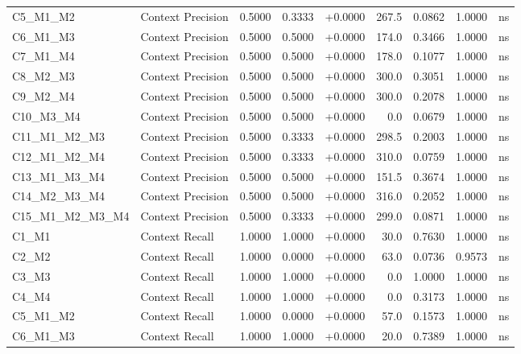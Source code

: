 \begin{table}[p]
\begin{tabular*}{\textwidth}{@{\extracolsep{\fill}} l l r r r r r r c @{}}
\addlinespace
C5\_M1\_M2      & Context Precision    & 0.5000 & 0.3333 & +0.0000 & 267.5 & 0.0862 & 1.0000 & ns \\
\addlinespace
C6\_M1\_M3      & Context Precision    & 0.5000 & 0.5000 & +0.0000 & 174.0 & 0.3466 & 1.0000 & ns \\
\addlinespace
C7\_M1\_M4      & Context Precision    & 0.5000 & 0.5000 & +0.0000 & 178.0 & 0.1077 & 1.0000 & ns \\
\addlinespace
C8\_M2\_M3      & Context Precision    & 0.5000 & 0.5000 & +0.0000 & 300.0 & 0.3051 & 1.0000 & ns \\
\addlinespace
C9\_M2\_M4      & Context Precision    & 0.5000 & 0.5000 & +0.0000 & 300.0 & 0.2078 & 1.0000 & ns \\
\addlinespace
C10\_M3\_M4     & Context Precision    & 0.5000 & 0.5000 & +0.0000 & 0.0 & 0.0679 & 1.0000 & ns \\
\addlinespace
C11\_M1\_M2\_M3 & Context Precision    & 0.5000 & 0.3333 & +0.0000 & 298.5 & 0.2003 & 1.0000 & ns \\
\addlinespace
C12\_M1\_M2\_M4 & Context Precision    & 0.5000 & 0.3333 & +0.0000 & 310.0 & 0.0759 & 1.0000 & ns \\
\addlinespace
C13\_M1\_M3\_M4 & Context Precision    & 0.5000 & 0.5000 & +0.0000 & 151.5 & 0.3674 & 1.0000 & ns \\
\addlinespace
C14\_M2\_M3\_M4 & Context Precision    & 0.5000 & 0.5000 & +0.0000 & 316.0 & 0.2052 & 1.0000 & ns \\
\addlinespace
C15\_M1\_M2\_M3\_M4 & Context Precision    & 0.5000 & 0.3333 & +0.0000 & 299.0 & 0.0871 & 1.0000 & ns \\
\addlinespace
C1\_M1          & Context Recall       & 1.0000 & 1.0000 & +0.0000 & 30.0 & 0.7630 & 1.0000 & ns \\
\addlinespace
C2\_M2          & Context Recall       & 1.0000 & 0.0000 & +0.0000 & 63.0 & 0.0736 & 0.9573 & ns \\
\addlinespace
C3\_M3          & Context Recall       & 1.0000 & 1.0000 & +0.0000 & 0.0 & 1.0000 & 1.0000 & ns \\
\addlinespace
C4\_M4          & Context Recall       & 1.0000 & 1.0000 & +0.0000 & 0.0 & 0.3173 & 1.0000 & ns \\
\addlinespace
C5\_M1\_M2      & Context Recall       & 1.0000 & 0.0000 & +0.0000 & 57.0 & 0.1573 & 1.0000 & ns \\
\addlinespace
C6\_M1\_M3      & Context Recall       & 1.0000 & 1.0000 & +0.0000 & 20.0 & 0.7389 & 1.0000 & ns \\

\end{tabular*}
\end{table}
